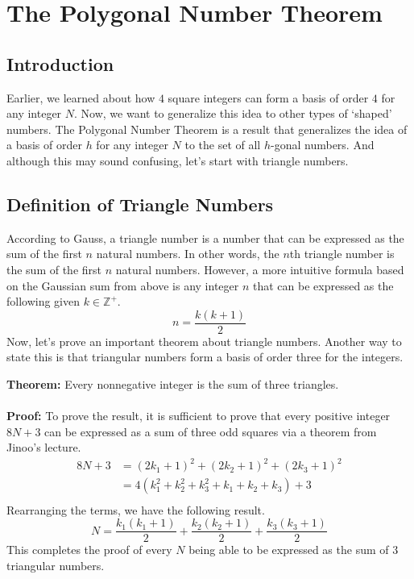 \section{The Polygonal Number Theorem}
\subsection{Introduction}
Earlier, we learned about how $4$ square integers can form a basis of order $4$ for any integer $N$. Now, we want to generalize this idea to other types of `shaped' numbers. The Polygonal Number Theorem is a result that generalizes the idea of a basis of order $h$ for any integer $N$ to the set of all $h$-gonal numbers. And although this may sound confusing, let's start with triangle numbers.
\subsection{Definition of Triangle Numbers}
According to Gauss, a triangle number is a number that can be expressed as the sum of the first $n$ natural numbers. In other words, the $n$th triangle number is the sum of the first $n$ natural numbers. However, a more intuitive formula based on the Gaussian sum from above is any integer $n$ that can be expressed as the following given $k \in \mathbb{Z}^+$.
$$
n = \frac{k(k+1)}{2}
$$
Now, let's prove an important theorem about triangle numbers. Another way to state this is that triangular numbers form a basis of order three for the integers.
\begin{boxedsection}
    \textbf{Theorem:} Every nonnegative integer is the sum of three triangles.\\
    \\
    \textbf{Proof:} To prove the result, it is sufficient to prove that every positive integer $8N + 3$ can be expressed as a sum of three odd squares via a theorem from Jinoo's lecture. 
    \begin{align*}
        8N + 3 &= (2k_1 + 1)^2 + (2k_2 + 1)^2 + (2k_3 + 1)^2 \\
        &= 4(k_1^2 + k_2^2 + k_3^2 + k_1 + k_2 + k_3) + 3\\
    \end{align*}
    Rearranging the terms, we have the following result.
    $$
    N = \frac{k_1(k_1+1)}{2} + \frac{k_2(k_2+1)}{2} + \frac{k_3(k_3+1)}{2}
    $$
    This completes the proof of every $N$ being able to be expressed as the sum of $3$ triangular numbers.
\end{boxedsection}
